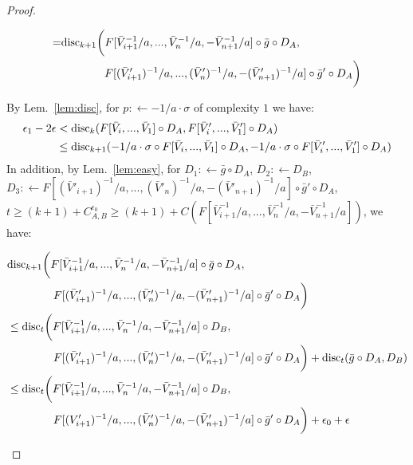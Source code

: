 \documentclass{article} %
\newcommand{\disc}{\textnormal{disc}}
\begin{document}
\begin{proof}
\begin{small}
\begin{equation}
\begin{aligned}
=& \disc_{k+1}\bigg( F[\bar{V}^{-1}_{i+1}/a,...,\bar{V}^{-1}_n/a,-\bar{V}^{-1}_{n+1}/a] \circ \bar{g} \circ D_A, \\
& \;\;\;\;\;\;\;\;\;\;\;\;\;\; F[(\bar{V}'_{i+1})^{-1}/a,...,(\bar{V}'_n)^{-1}/a,-(\bar{V}'_{n+1})^{-1}/a] \circ \bar{g}' \circ D_A\bigg) \\
\end{aligned}
\end{equation}
\end{small}
By Lem.~\ref{lem:disc}, for $p :\leftarrow -1/a \cdot \sigma$ of complexity $1$ we have:
\begin{equation}
\begin{aligned}
\epsilon_1 - 2\epsilon &< \disc_{k}(F[\bar{V}_i,...,\bar{V}_1] \circ D_A, F[\bar{V}'_i,...,\bar{V}'_1] \circ D_A) \\
&\leq  \disc_{k+1}(-1/a \cdot \sigma \circ F[\bar{V}_i,...,\bar{V}_1] \circ D_A, -1/a \cdot \sigma \circ F[\bar{V}'_i,...,\bar{V}'_1] \circ D_A)
\end{aligned}
\end{equation}
In addition, by Lem.~\ref{lem:easy}, for $D_1 :\leftarrow \bar{g} \circ D_A$, $D_2 :\leftarrow D_B$, $D_3 :\leftarrow F[(\bar{V}'_{i+1})^{-1}/a,...,(\bar{V}'_n)^{-1}/a,-(\bar{V}'_{n+1})^{-1}/a] \circ \bar{g}' \circ D_A$, $t \geq (k+1) + C^{\epsilon_0}_{A,B} \geq (k+1) + C(F[\bar{V}^{-1}_{i+1}/a,...,\bar{V}^{-1}_n/a,-\bar{V}^{-1}_{n+1}/a])$, we have:
\begin{small}
\begin{equation}
\begin{aligned}
&\disc_{k+1}\bigg(F[\bar{V}^{-1}_{i+1}/a,...,\bar{V}^{-1}_n/a,-\bar{V}^{-1}_{n+1}/a] \circ \bar{g} \circ D_A, \\
&\;\;\;\;\;\;\;\;\;\;\;\;\;\;\; 
F[(\bar{V}'_{i+1})^{-1}/a,...,(\bar{V}'_n)^{-1}/a,-(\bar{V}'_{n+1})^{-1}/a] \circ \bar{g}' \circ D_A\bigg) \\
&\leq \disc_{t}\bigg(F[\bar{V}^{-1}_{i+1}/a,...,\bar{V}^{-1}_n/a,-\bar{V}^{-1}_{n+1}/a] \circ D_B, \\
&\;\;\;\;\;\;\;\;\;\;\;\;\;\;\; F[(\bar{V}'_{i+1})^{-1}/a,...,(\bar{V}'_n)^{-1}/a,-(\bar{V}'_{n+1})^{-1}/a] \circ \bar{g}' \circ D_A \bigg) + \disc_{t}(\bar{g} \circ D_A, D_B) \\
&\leq \disc_{t}\bigg(F[\bar{V}^{-1}_{i+1}/a,...,\bar{V}^{-1}_n/a,-\bar{V}^{-1}_{n+1}/a] \circ D_B, \\
&\;\;\;\;\;\;\;\;\;\;\;\;\;\;\; F[(V'_{i+1})^{-1}/a,...,(\bar{V}'_n)^{-1}/a,-(\bar{V}'_{n+1})^{-1}/a] \circ \bar{g}' \circ D_A \bigg)+\epsilon_0+\epsilon  \\

\end{aligned}
\end{equation}
\end{small}
\end{proof}
\end{document}
